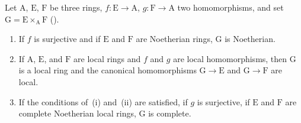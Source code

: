 \begin{lemma}[19.3.2.1]
\label{IV.19.3.2.1}
Let $\mathrm{A}$, $\mathrm{E}$, $\mathrm{F}$ be three rings, $f:\mathrm{E}\to\mathrm{A}$, $g:\mathrm{F}\to\mathrm{A}$ two homomorphisms, and set $\mathrm{G}=\mathrm{E}\times_{\mathrm{A}}\mathrm{F}$ ().
\begin{enumerate}[label=(\roman*)]
  \item If $f$ is surjective and if $\mathrm{E}$ and $\mathrm{F}$ are Noetherian rings, $\mathrm{G}$ is Noetherian.
  \item If $\mathrm{A}$, $\mathrm{E}$, and $\mathrm{F}$ are local rings and $f$ and $g$ are local homomorphisms, then $\mathrm{G}$ is a local ring and the canonical homomorphisms $\mathrm{G}\to\mathrm{E}$ and $\mathrm{G}\to\mathrm{F}$ are local.
  \item If the conditions of~(i) and~(ii) are satisfied, if $g$ is surjective, if $\mathrm{E}$ and $\mathrm{F}$ are complete Noetherian local rings, $\mathrm{G}$ is complete.
\end{enumerate}
\end{lemma}


